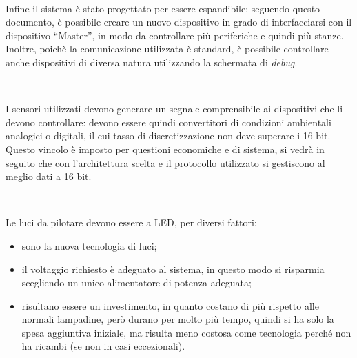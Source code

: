 \documentclass[a4paper,titlepage]{book}
\newcommand{\itema}{\begin{itemize}[noitemsep,topsep=10pt,parsep=5pt,partopsep=10pt]}
\begin{document}
~

Infine il sistema è stato progettato per essere espandibile: seguendo questo documento, è possibile creare un nuovo dispositivo in grado di interfacciarsi con il dispositivo ``Master'', in modo da controllare più periferiche e quindi più stanze. Inoltre, poichè la comunicazione utilizzata è standard, è possibile controllare anche dispositivi di diversa natura utilizzando la schermata di \textit{debug}.

~

I sensori utilizzati devono generare un segnale comprensibile ai dispositivi che li devono controllare: devono essere quindi convertitori di condizioni ambientali analogici o digitali, il cui tasso di discretizzazione non deve superare i 16 bit. Questo vincolo è imposto per questioni economiche e di sistema, si vedrà in seguito che con l'architettura scelta e il protocollo utilizzato si gestiscono al meglio dati a 16 bit.

~

Le luci da pilotare devono essere a LED, per diversi fattori:

\itema

\item sono la nuova tecnologia di luci;

\item il voltaggio richiesto è adeguato al sistema, in questo modo si risparmia scegliendo un unico alimentatore di potenza adeguata;

\item risultano essere un investimento, in quanto costano di più rispetto alle normali lampadine, però durano per molto più tempo, quindi si ha solo la spesa aggiuntiva iniziale, ma risulta meno costosa come tecnologia perché non ha ricambi (se non in casi eccezionali).

\end{itemize}

\end{document}
